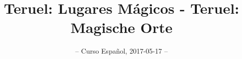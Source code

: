 \documentclass[landscape, pagesize, DIV=15, fontsize=11pt, parskip=half, oneside, BCOR=5mm]{scrartcl}
\begin{document}
\title{Teruel: Lugares Mágicos - Teruel: Magische Orte}
\date{-- Curso Español, 2017-05-17 --}

\maketitle
\clearpage

\newcommand{\rn}[1]{\Rnode{#1}}
\newcommand{\rl}[2]{\ncline[linestyle=solid,arrows=->,nodesepA=0.5pt,linecolor=gray, strokeopacity=0.5]{#1}{#2}}
\newcommand{\sidenote}[1]{\marginpar[#1]{#1}}
\newcommand{\ul}[1]{\underline{#1}}


\end{document}
